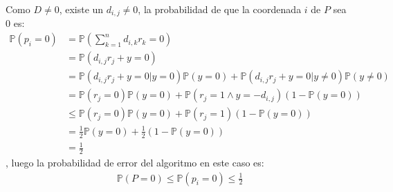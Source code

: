 \documentclass[dcc,uchile]{fcfmcourse}
\theoremstyle{plain}
\theoremstyle{definition}
\begin{document}
\begin{problems}
Como $D\not = 0$, existe un $d_{i,j}\not = 0$, la probabilidad de que la coordenada $i$ de $P$ sea 0 es:
\begin{align*}
    \mathbb{P}\left(p_{i} = 0\right) &= \mathbb{P}\left(\sum_{k=1}^n d_{i,k}r_k = 0\right)\\
    &=\mathbb{P}\left(d_{i,j}r_j + y = 0\right)\\
    &= \mathbb{P}\left(d_{i,j}r_j + y = 0 | y = 0\right)\mathbb{P}(y = 0) + \mathbb{P}\left(d_{i,j}r_j + y = 0 | y \not= 0\right)\mathbb{P}(y \not= 0)\\
    &=  \mathbb{P}\left(r_j = 0\right)\mathbb{P}(y = 0) + \mathbb{P}\left(r_j = 1 \land  y = -d_{i,j} \right)(1-\mathbb{P}(y = 0))\\
    &\le \mathbb{P}\left(r_j = 0\right)\mathbb{P}(y = 0) + \mathbb{P}\left(r_j = 1\right)(1-\mathbb{P}(y = 0))\\
    &= \frac{1}{2}\mathbb{P}(y = 0) + \frac{1}{2}(1-\mathbb{P}(y = 0))\\
    &= \frac{1}{2}
\end{align*}
, luego la probabilidad de error del algoritmo en este caso es:
\begin{align*}
    \mathbb{P}(P=0) \le \mathbb{P}(p_{i}=0)\le \frac{1}{2}
\end{align*}
\end{problems}
\end{document}
